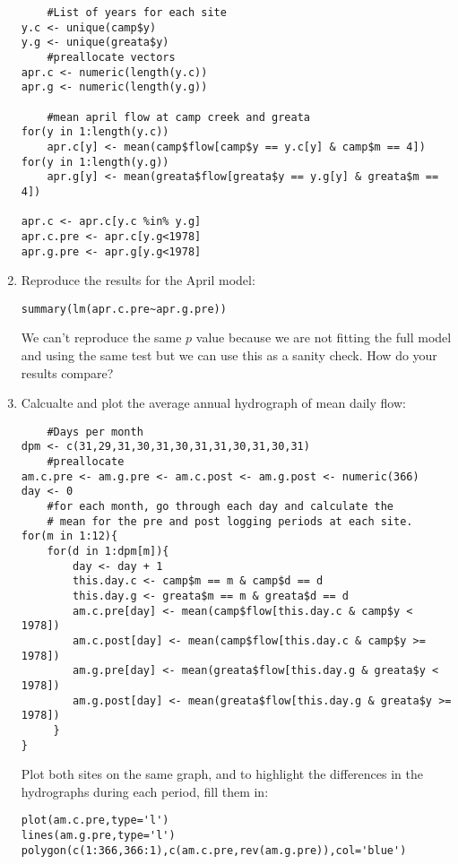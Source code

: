 \documentclass[11pt]{article}
\begin{document}
\begin{enumerate}
\begin{verbatim}
    #List of years for each site
y.c <- unique(camp$y)
y.g <- unique(greata$y)
    #preallocate vectors
apr.c <- numeric(length(y.c))
apr.g <- numeric(length(y.g))

    #mean april flow at camp creek and greata
for(y in 1:length(y.c))
    apr.c[y] <- mean(camp$flow[camp$y == y.c[y] & camp$m == 4])
for(y in 1:length(y.g))
    apr.g[y] <- mean(greata$flow[greata$y == y.g[y] & greata$m == 4])

apr.c <- apr.c[y.c %in% y.g]
apr.c.pre <- apr.c[y.g<1978]
apr.g.pre <- apr.g[y.g<1978]
\end{verbatim}

\item Reproduce the results for the April model:

\begin{verbatim}
summary(lm(apr.c.pre~apr.g.pre))
\end{verbatim}

We can't reproduce the same $p$ value because we are not fitting the full model and using the same test but we can use this as a sanity check. How do your results compare?

\clearpage
\item Calcualte and plot the average annual hydrograph of mean daily flow:

\begin{verbatim}
    #Days per month
dpm <- c(31,29,31,30,31,30,31,31,30,31,30,31)
    #preallocate
am.c.pre <- am.g.pre <- am.c.post <- am.g.post <- numeric(366)
day <- 0
    #for each month, go through each day and calculate the 
    # mean for the pre and post logging periods at each site. 
for(m in 1:12){
    for(d in 1:dpm[m]){
        day <- day + 1
        this.day.c <- camp$m == m & camp$d == d
        this.day.g <- greata$m == m & greata$d == d
        am.c.pre[day] <- mean(camp$flow[this.day.c & camp$y < 1978])
        am.c.post[day] <- mean(camp$flow[this.day.c & camp$y >= 1978])
        am.g.pre[day] <- mean(greata$flow[this.day.g & greata$y < 1978])
        am.g.post[day] <- mean(greata$flow[this.day.g & greata$y >= 1978])
     }
}

\end{verbatim}

Plot both sites on the same graph, and to highlight the differences in the hydrographs during each period, fill them in:

\begin{verbatim}
plot(am.c.pre,type='l')
lines(am.g.pre,type='l')
polygon(c(1:366,366:1),c(am.c.pre,rev(am.g.pre)),col='blue')
\end{verbatim}


\end{enumerate}
\end{document}
